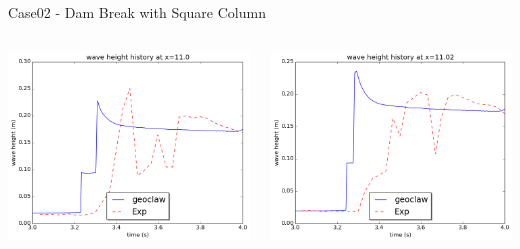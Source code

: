 \documentclass[xcolor=dvipsnames]{beamer}
\begin{document}
\begin{frame}[label=sec-5-4]{Case02 - Dam Break with Square Column}
\begin{columns}
\begin{column}{0.5\textwidth}
\begin{block}{}
\includegraphics[width=.9\linewidth]{../paper/plots/waveheight_square_x11.png} \\
\end{block}
\end{column}

\begin{column}{0.5\textwidth}
\begin{block}{}
\includegraphics[width=.9\linewidth]{../paper/plots/waveheight_square_x1102.png}  \\
\end{block}
\end{column}
\end{columns}


\end{frame}
\end{document}
